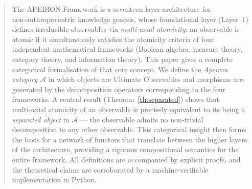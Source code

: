 \begin{abstract}
The APEIRON Framework is a seventeen‑layer architecture for non‑anthropocentric knowledge genesis, whose foundational layer (Layer~1) defines irreducible observables via \emph{multi‑axial atomicity}: an observable is atomic if it simultaneously satisfies the atomicity criteria of four independent mathematical frameworks (Boolean algebra, measure theory, category theory, and information theory).
This paper gives a complete categorical formalisation of that core concept.
We define the \emph{Apeiron category} $\mathcal{A}$ in which objects are Ultimate Observables and morphisms are generated by the decomposition operators corresponding to the four frameworks.
A central result (Theorem~\ref{th:separated}) shows that multi‑axial atomicity of an observable is precisely equivalent to its being a \emph{separated object} in $\mathcal{A}$ --- the observable admits no non‑trivial decomposition to any other observable.
This categorical insight then forms the basis for a network of functors that translate between the higher layers of the architecture, providing a rigorous compositional semantics for the entire framework.
All definitions are accompanied by explicit proofs, and the theoretical claims are corroborated by a machine‑verifiable implementation in Python.
\end{abstract}